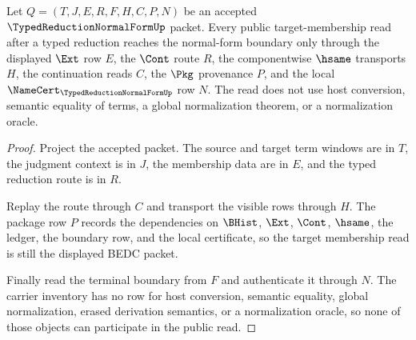 \begin{theorem}
\label{thm:typed-reduction-normal-form-subject-reduction-seal}
Let $Q=(T,J,E,R,F,H,C,P,N)$ be an accepted $\TypedReductionNormalFormUp$ packet. Every public target-membership read after a typed reduction reaches the normal-form boundary only through the displayed $\Ext$ row $E$, the $\Cont$ route $R$, the componentwise $\hsame$ transports $H$, the continuation reads $C$, the $\Pkg$ provenance $P$, and the local $\NameCert_{\TypedReductionNormalFormUp}$ row $N$. The read does not use host conversion, semantic equality of terms, a global normalization theorem, or a normalization oracle.
\end{theorem}
\begin{proof}
Project the accepted packet. The source and target term windows are in $T$, the judgment context is in $J$, the membership data are in $E$, and the typed reduction route is in $R$.

Replay the route through $C$ and transport the visible rows through $H$. The package row $P$ records the dependencies on $\BHist$, $\Ext$, $\Cont$, $\hsame$, the ledger, the boundary row, and the local certificate, so the target membership read is still the displayed BEDC packet.

Finally read the terminal boundary from $F$ and authenticate it through $N$. The carrier inventory has no row for host conversion, semantic equality, global normalization, erased derivation semantics, or a normalization oracle, so none of those objects can participate in the public read.
\end{proof}

